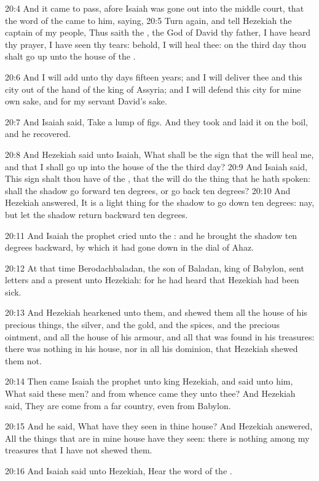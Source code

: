 20:4 And it came to pass, afore Isaiah was gone out into the middle court, that the word of the \LORD came to him, saying, 20:5 Turn again, and tell Hezekiah the captain of my people, Thus saith the \LORD, the God of David thy father, I have heard thy prayer, I have seen thy tears: behold, I will heal thee: on the third day thou shalt go up unto the house of the \LORD.

20:6 And I will add unto thy days fifteen years; and I will deliver thee and this city out of the hand of the king of Assyria; and I will defend this city for mine own sake, and for my servant David's sake.

20:7 And Isaiah said, Take a lump of figs. And they took and laid it on the boil, and he recovered.

20:8 And Hezekiah said unto Isaiah, What shall be the sign that the \LORD will heal me, and that I shall go up into the house of the \LORD the third day?  20:9 And Isaiah said, This sign shalt thou have of the \LORD, that the \LORD will do the thing that he hath spoken: shall the shadow go forward ten degrees, or go back ten degrees?  20:10 And Hezekiah answered, It is a light thing for the shadow to go down ten degrees: nay, but let the shadow return backward ten degrees.

20:11 And Isaiah the prophet cried unto the \LORD: and he brought the shadow ten degrees backward, by which it had gone down in the dial of Ahaz.

20:12 At that time Berodachbaladan, the son of Baladan, king of Babylon, sent letters and a present unto Hezekiah: for he had heard that Hezekiah had been sick.

20:13 And Hezekiah hearkened unto them, and shewed them all the house of his precious things, the silver, and the gold, and the spices, and the precious ointment, and all the house of his armour, and all that was found in his treasures: there was nothing in his house, nor in all his dominion, that Hezekiah shewed them not.

20:14 Then came Isaiah the prophet unto king Hezekiah, and said unto him, What said these men? and from whence came they unto thee? And Hezekiah said, They are come from a far country, even from Babylon.

20:15 And he said, What have they seen in thine house? And Hezekiah answered, All the things that are in mine house have they seen: there is nothing among my treasures that I have not shewed them.

20:16 And Isaiah said unto Hezekiah, Hear the word of the \LORD.


